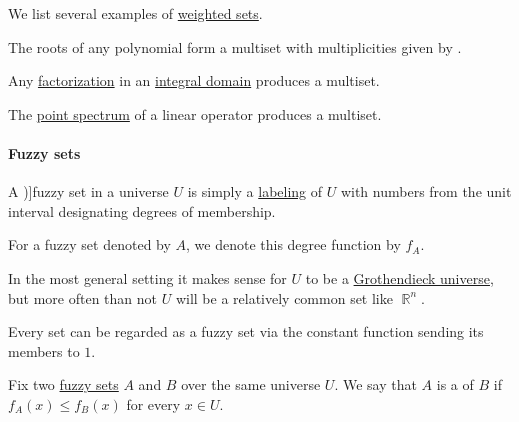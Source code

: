 \begin{example}\label{ex:def:multiset}
  We list several examples of \hyperref[def:labeled_set]{weighted sets}.

  \begin{itemize}
     The roots of any polynomial form a multiset with multiplicities given by .

     Any \hyperref[def:irreducible_factorization]{factorization} in an \hyperref[def:integral_domain]{integral domain} produces a multiset.

     The \hyperref[def:eigenpair]{point spectrum} of a linear operator produces a multiset.
  \end{itemize}
\end{example}

\paragraph{Fuzzy sets}

\begin{definition}\label{def:fuzzy_set}
  A \term[ru=нечёткое множество (\cite[27]{БогомоловСалий1997ОбщаяАлгебра})]{fuzzy set} in a universe \( U \) is simply a \hyperref[def:labeled_set]{labeling} of \( U \) with numbers from the unit interval designating degrees of membership.

  For a fuzzy set denoted by \( A \), we denote this degree function by \( f_A \).
\end{definition}
\begin{comments}
  \item In the most general setting it makes sense for \( U \) to be a \hyperref[def:grothendieck_universe]{Grothendieck universe}, but more often than not \( U \) will be a relatively common set like \( \BbbR^n \).

  \item Every set can be regarded as a fuzzy set via the constant function sending its members to \( 1 \).
\end{comments}

\begin{definition}\label{def:fuzzy_subset}
  Fix two \hyperref[def:fuzzy_set]{fuzzy sets} \( A \) and \( B \) over the same universe \( U \). We say that \( A \) is a  of \( B \) if \( f_A(x) \leq f_B(x) \) for every \( x \in U \).
\end{definition}

